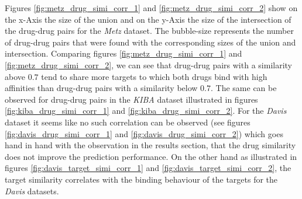 Figures \ref{fig:metz_drug_simi_corr_1} and \ref{fig:metz_drug_simi_corr_2} show on the x-Axis the size of the union and on the y-Axis the size of the intersection of the drug-drug pairs for the \textit{Metz} dataset. The bubble-size represents the number of drug-drug pairs that were found with the corresponding sizes of the union and intersection. Comparing figures \ref{fig:metz_drug_simi_corr_1} and \ref{fig:metz_drug_simi_corr_2}, we can see that drug-drug pairs with a similarity above $0.7$ tend to share more targets to which both drugs bind with high affinities than drug-drug pairs with a similarity below $0.7$. The same can be observed for drug-drug pairs in the \textit{KIBA} dataset illustrated in figures \ref{fig:kiba_drug_simi_corr_1} and \ref{fig:kiba_drug_simi_corr_2}. For the \textit{Davis} dataset it seems like no such correlation can be observed (see figures \ref{fig:davis_drug_simi_corr_1} and \ref{fig:davis_drug_simi_corr_2}) which goes hand in hand with the observation in the results section, that the drug similarity does not improve the prediction performance. On the other hand as illustrated in figures \ref{fig:davis_target_simi_corr_1} and \ref{fig:davis_target_simi_corr_2}, the target similarity correlates with the binding behaviour of the targets for the \textit{Davis} datasets.


